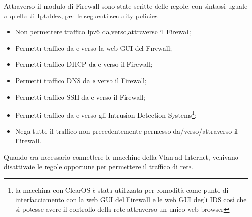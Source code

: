 Attraverso il modulo di Firewall sono state scritte delle regole, con sintassi uguale a quella di Iptables, per le seguenti security policies:\begin{itemize}
    \item Non permettere traffico ipv6 da,verso,attraverso il Firewall;
    \item Permetti traffico  da e verso la web GUI del Firewall;
    \item Permetti traffico  DHCP da e verso il Firewall;
    \item Permetti traffico  DNS da e verso il Firewall;
    \item Permetti traffico  SSH da e verso il Firewall;
    \item Permetti traffico da e verso gli Intrusion Detection Systems\footnote{la macchina con ClearOS è stata utilizzata per comodità come  punto di interfacciamento con la web GUI del Firewall e le web GUI degli IDS così che si potesse avere il controllo della rete attraverso un unico web browser};
    \item Nega tutto il traffico non precedentemente permesso da/verso/attraverso il Firewall.
\end{itemize}

Quando era necessario connettere le macchine della Vlan ad Internet, venivano disattivate le regole opportune per permettere il traffico di rete. 

